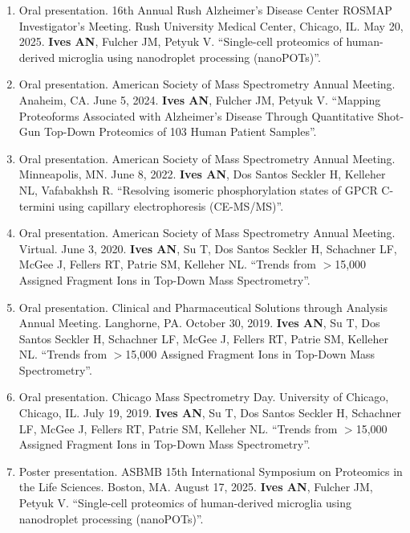 \documentclass[10pt, letterpaper]{article}
\begin{document}
\begin{enumerate}[leftmargin=*, label=\arabic*., topsep=2pt, itemsep=4pt]

  \item Oral presentation. 16th Annual Rush Alzheimer's Disease Center ROSMAP Investigator's Meeting.
  Rush University Medical Center, Chicago, IL. May 20, 2025. \textbf{Ives AN}, Fulcher JM, Petyuk V.
  ``Single-cell proteomics of human-derived microglia using nanodroplet processing (nanoPOTs)''.

  \item Oral presentation. American Society of Mass Spectrometry Annual Meeting. Anaheim, CA.
  June 5, 2024. \textbf{Ives AN}, Fulcher JM, Petyuk V. ``Mapping Proteoforms Associated with
  Alzheimer's Disease Through Quantitative Shot-Gun Top-Down Proteomics of 103 Human Patient Samples''.

  \item Oral presentation. American Society of Mass Spectrometry Annual Meeting. Minneapolis, MN.
  June 8, 2022. \textbf{Ives AN}, Dos Santos Seckler H, Kelleher NL, Vafabakhsh R. ``Resolving
  isomeric phosphorylation states of GPCR C-termini using capillary electrophoresis (CE-MS/MS)''.

  \item Oral presentation. American Society of Mass Spectrometry Annual Meeting. Virtual.
  June 3, 2020. \textbf{Ives AN}, Su T, Dos Santos Seckler H, Schachner LF, McGee J, Fellers RT,
  Patrie SM, Kelleher NL. ``Trends from $>$15,000 Assigned Fragment Ions in Top-Down Mass
  Spectrometry''.

  \item Oral presentation. Clinical and Pharmaceutical Solutions through Analysis Annual Meeting.
  Langhorne, PA. October 30, 2019. \textbf{Ives AN}, Su T, Dos Santos Seckler H, Schachner LF,
  McGee J, Fellers RT, Patrie SM, Kelleher NL. ``Trends from $>$15,000 Assigned Fragment Ions in
  Top-Down Mass Spectrometry''.

  \item Oral presentation. Chicago Mass Spectrometry Day. University of Chicago, Chicago, IL. July 19, 2019.
  \textbf{Ives AN}, Su T, Dos Santos Seckler H, Schachner LF, McGee J, Fellers RT, Patrie SM,
  Kelleher NL. ``Trends from $>$15,000 Assigned Fragment Ions in Top-Down Mass Spectrometry''.

  \item Poster presentation. ASBMB 15th International Symposium on Proteomics in the Life Sciences.
  Boston, MA. August 17, 2025. \textbf{Ives AN}, Fulcher JM, Petyuk V. ``Single-cell proteomics of
  human-derived microglia using nanodroplet processing (nanoPOTs)''.


\end{enumerate}
\end{document}
